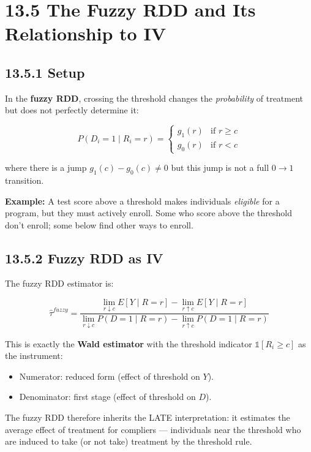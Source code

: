\section{13.5 The Fuzzy RDD and Its Relationship to IV}

\subsection{13.5.1 Setup}

In the \textbf{fuzzy RDD}, crossing the threshold changes the \textit{probability} of treatment but does not perfectly determine it:

\[
P(D_i = 1 \mid R_i = r) = \begin{cases} g_1(r) & \text{if } r \geq c \\ g_0(r) & \text{if } r < c \end{cases}
\]

where there is a jump $g_1(c) - g_0(c) \neq 0$ but this jump is not a full $0 \to 1$ transition.

\textbf{Example:} A test score above a threshold makes individuals \textit{eligible} for a program, but they must actively enroll. Some who score above the threshold don't enroll; some below find other ways to enroll.

\subsection{13.5.2 Fuzzy RDD as IV}

The fuzzy RDD estimator is:

\[
\hat{\tau}^{fuzzy} = \frac{\lim_{r\downarrow c}E[Y\mid R=r] - \lim_{r\uparrow c}E[Y\mid R=r]}{\lim_{r\downarrow c}P(D=1\mid R=r) - \lim_{r\uparrow c}P(D=1\mid R=r)}
\]

This is exactly the \textbf{Wald estimator} with the threshold indicator $\mathbb{1}[R_i \geq c]$ as the instrument:
\begin{itemize}
\item Numerator: reduced form (effect of threshold on $Y$).
\item Denominator: first stage (effect of threshold on $D$).
\end{itemize}

The fuzzy RDD therefore inherits the LATE interpretation: it estimates the average effect of treatment for compliers --- individuals near the threshold who are induced to take (or not take) treatment by the threshold rule.

